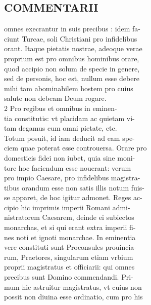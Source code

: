 \documentclass{article}
\begin{document}
\begin{pages}
\section*{COMMENTARII \\
                }omnes execrantur in suis precibus : idem fa- \\
                ciunt Turcae, soli Christiani pro infidelibus \\
                orant. Itaque pietatis nostrae, adeoque verae \\
                proprium est pro omnibus hominibus orare, \\
                quod accipio non solum de specie in genere, \\
                sed de personis, hoc est, nullum esse debere \\
                mihi tam abominabilem hostem pro cuius \\
                salute non debeam Deum rogare. \\
                2 Pro regibus et omnibus in eminen- \\
                tia constitutis: vt placidam ac quietam vi- \\
                tam degamus cum omni pietate, etc. \\
                Totum posuit, id iam deducit ad eam spe- \\
                ciem quae poterat esse controuersa. Orare pro \\
                domesticis fidei non iubet, quia sine moni- \\
                tore hoc faciendum esse nouerant: verum \\
                pro impio Caesare, pro infidelibus magistra- \\
                tibus orandum esse non satis illis notum fuis- \\
                se apparet, de hoc igitur admonet. Reges ac- \\
                cipio hic imprimis imperii Romani admi- \\
                nistratorem Caesarem, deinde ei subiectos \\
                monarchas, et si qui erant extra imperii fi- \\
                nes noti et ignoti monarchae. In eminentia \\
                vere constituti sunt Proconsules prouincia- \\
                rum, Praetores, singularum etiam vrbium \\
                proprii magistratus et officiarii: qui omnes \\
                precibus sunt Domino commendandi. Pri- \\
                mum hic astruitur magistratus, vt cuius non \\
                possit non diuina esse ordinatio, cum pro his \\
                

\end{pages}
\end{document}
